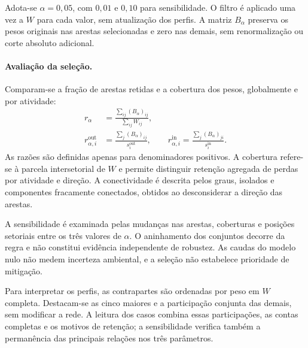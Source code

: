 Adota-se $\alpha=0{,}05$, com $0{,}01$ e $0{,}10$ para sensibilidade. O filtro é aplicado uma vez a $W$ para cada valor, sem atualização dos perfis. A matriz $B_\alpha$ preserva os pesos originais nas arestas selecionadas e zero nas demais, sem renormalização ou corte absoluto adicional.

\paragraph{Avaliação da seleção.}
Comparam-se a fração de arestas retidas e a cobertura dos pesos, globalmente e por atividade:
\begin{equation}
\begin{aligned}
r_\alpha&=\frac{\sum_{ij}(B_\alpha)_{ij}}{\sum_{ij}W_{ij}},\\
r_{\alpha,i}^{\mathrm{out}}&=\frac{\sum_j(B_\alpha)_{ij}}{s_i^{\mathrm{out}}},\qquad
r_{\alpha,i}^{\mathrm{in}}=\frac{\sum_j(B_\alpha)_{ji}}{s_i^{\mathrm{in}}}.
\end{aligned}
\label{eq:cobertura-backbone}
\end{equation}
As razões são definidas apenas para denominadores positivos. A cobertura refere-se à parcela intersetorial de $W$ e permite distinguir retenção agregada de perdas por atividade e direção. A conectividade é descrita pelos graus, isolados e componentes fracamente conectados, obtidos ao desconsiderar a direção das arestas.

A sensibilidade é examinada pelas mudanças nas arestas, coberturas e posições setoriais entre os três valores de $\alpha$. O aninhamento dos conjuntos decorre da regra e não constitui evidência independente de robustez. As caudas do modelo nulo não medem incerteza ambiental, e a seleção não estabelece prioridade de mitigação.

Para interpretar os perfis, as contrapartes são ordenadas por peso em $W$ completa. Destacam-se as cinco maiores e a participação conjunta das demais, sem modificar a rede. A leitura dos casos combina essas participações, as contas completas e os motivos de retenção; a sensibilidade verifica também a permanência das principais relações nos três parâmetros.
